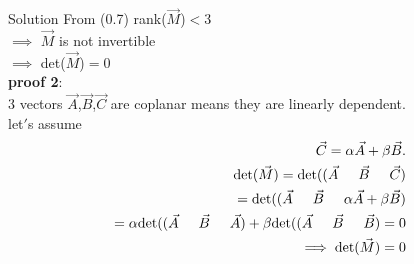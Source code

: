 \documentclass{beamer}
\numberwithin{equation}{section}
\theoremstyle{remark}
\begin{document}
\begin{frame}{Solution}
From (0.7)  rank($\Vec{M}$)$<$3 \\
$\implies$ $\Vec{M}$ is not invertible\\
$\implies$ det($\Vec{M}$)$=$0 \\
    \textbf{proof 2}:\\
 3 vectors $\Vec{A}$,$\Vec{B}$,$\Vec{C}$ are coplanar means they are linearly dependent.\\
 let$'$s assume
 \begin{align}
     \Vec{C}=\alpha \Vec{A}+\beta \Vec{B}.\\
     \text{det}(\Vec{M})=\text{det}((\Vec{A} \hspace{0.5cm} \Vec{B} \hspace{0.5cm} \Vec{C})\\
 =\text{det}((\Vec{A} \hspace{0.5cm} \Vec{B} \hspace{0.5cm} \alpha \Vec{A}+\beta \Vec{B})\\
 =\alpha \text{det}((\Vec{A} \hspace{0.5cm} \Vec{B} \hspace{0.5cm} \Vec{A}) + \beta \text{det}((\Vec{A} \hspace{0.5cm} \Vec{B} \hspace{0.5cm} \Vec{B})=0\\
 \implies \text{det}(\Vec{M})=0
 \end{align}
\end{frame}
\end{document}
